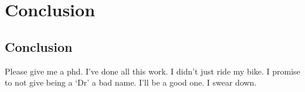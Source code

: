 \chapter{Conclusion}

\ifpdf
    \graphicspath{{Chapter10/Figs/Raster/}{Chapter10/Figs/PDF/}{Chapter10/Figs/}}
\else
    \graphicspath{{Chapter10/Figs/Vector/}{Chapter10/Figs/}}
\fi


\section{Conclusion}  %

Please give me a phd. I've done all this work. I didn't just ride my bike.
I promise to not give being a `Dr' a bad name. I'll be a good one. I swear down.